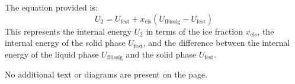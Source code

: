 The equation provided is:  
\[
U_2 = U_{\text{fest}} + x_{\text{eis}} \left( U_{\text{flüssig}} - U_{\text{fest}} \right)
\]  
This represents the internal energy \( U_2 \) in terms of the ice fraction \( x_{\text{eis}} \), the internal energy of the solid phase \( U_{\text{fest}} \), and the difference between the internal energy of the liquid phase \( U_{\text{flüssig}} \) and the solid phase \( U_{\text{fest}} \).  

No additional text or diagrams are present on the page.